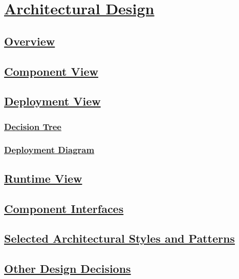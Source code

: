 \section[Architectural Design]{\hyperlink{toc}{Architectural Design}}
	\label{sec:architecturalDesign}
	
	\subsection[Overview]{\hyperlink{toc}{Overview}}
		\label{sec:overview}
	
	\subsection[Component View]{\hyperlink{toc}{Component View}}
		\label{sec:componentView}
		
	\subsection[Deployment View]{\hyperlink{toc}{Deployment View}}
		\label{sec:deploymentView}
		
		\subsubsection[Decision Tree]{\hyperlink{toc}{Decision Tree}}
			\label{sec:decisionTree}
			
		\subsubsection[Deployment Diagram]{\hyperlink{toc}{Deployment Diagram}}
			\label{sec:deploymentDiagram}
			
	\subsection[Runtime View]{\hyperlink{toc}{Runtime View}}
		\label{sec:runtimeView}
		
	\subsection[Component Interfaces]{\hyperlink{toc}{Component Interfaces}}
		\label{sec:componentInterfaces}
		
	\subsection[Selected Architectural Styles and Patterns]{\hyperlink{toc}{Selected Architectural Styles and Patterns}}
		\label{sec:selectedArchitecturalStylesAndPatterns}
		
	\subsection[Other Design Decisions]{\hyperlink{toc}{Other Design Decisions}}
		\label{sec:otherDesignDecisions}						